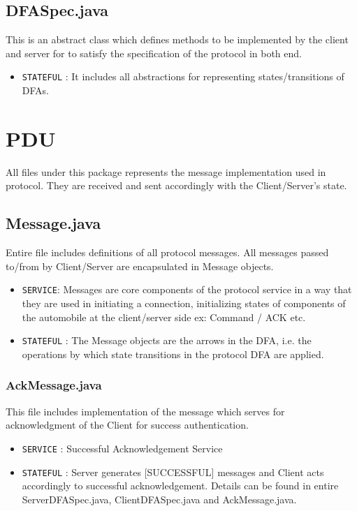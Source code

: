 \documentclass[12pt]{usenixsubmit}
\begin{document}
\subsection{DFASpec.java}This is an abstract class which defines methods to be implemented by the client and server for to satisfy the specification of the protocol in both end.
\begin{itemize}
  \item {\tt STATEFUL} : It includes all abstractions for representing states/transitions of DFAs.
\end{itemize}

  \section{PDU} All files under this package represents the message implementation used in protocol. They are received and sent accordingly with the Client/Server's state.

     \subsection{Message.java} Entire file includes definitions of all protocol messages. All messages passed to/from by Client/Server are encapsulated in Message objects.
     \begin{itemize}
     \item {\tt SERVICE}:  Messages are core components of the protocol service in a way that they are used in initiating a connection, initializing states of components of the automobile at the client/server side ex: Command / ACK  etc.
     \item {\tt STATEFUL} : The Message objects are the arrows in the DFA, i.e. the operations by which state transitions in the protocol DFA are applied.
     \end{itemize}
\subsubsection{AckMessage.java} This file includes implementation of the message which serves for acknowledgment of the Client for success authentication.
     \begin{itemize}
     \item {\tt SERVICE} : Successful Acknowledgement Service
     \item {\tt STATEFUL} : Server generates [SUCCESSFUL] messages and Client acts accordingly to successful acknowledgement. Details can be found in entire ServerDFASpec.java, ClientDFASpec.java and AckMessage.java.
     \end{itemize}
\end{document}
